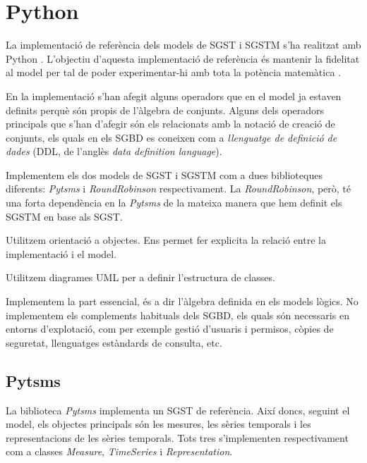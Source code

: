 

\chapter{Python}


La implementació de referència dels models de SGST i SGSTM s'ha
realitzat amb Python . L'objectiu d'aquesta
implementació de referència és mantenir la fidelitat al model per tal
de poder experimentar-hi amb tota la potència matemàtica .

En la implementació s'han afegit alguns operadors que en el model ja
estaven definits perquè són propis de l'àlgebra de conjunts. Alguns
dels operadors principals que s'han d'afegir són els relacionats amb
la notació de creació de conjunts, els quals en els SGBD es coneixen
com a \emph{llenguatge de definició de dades} (DDL, de l'anglès
\emph{data definition language}). 


Implementem els dos models de SGST i SGSTM com a dues biblioteques
diferents: \emph{Pytsms} i \emph{RoundRobinson} respectivament. La
\emph{RoundRobinson}, però, té una forta dependència en la
\emph{Pytsms} de la mateixa manera que hem definit els SGSTM en base
als SGST.


Utilitzem orientació a objectes. Ens permet fer explicita la relació
entre la implementació i el model. 

Utilitzem diagrames UML per a definir l'estructura de classes. 


Implementem la part essencial, és a dir l'àlgebra definida en els
models lògics. No implementem els complements habituals dels SGBD, els
quals són necessaris en entorns d'explotació, com per exemple gestió
d'usuaris i permisos, còpies de seguretat, llenguatges estàndards de
consulta, etc.




\section{Pytsms}

La biblioteca \emph{Pytsms} implementa un SGST de referència. Així
doncs, seguint el model, els objectes principals són les mesures, les
sèries temporals i les representacions de les sèries temporals. Tots
tres s'implementen respectivament com a classes \emph{Measure},
\emph{TimeSeries} i \emph{Representation}.


